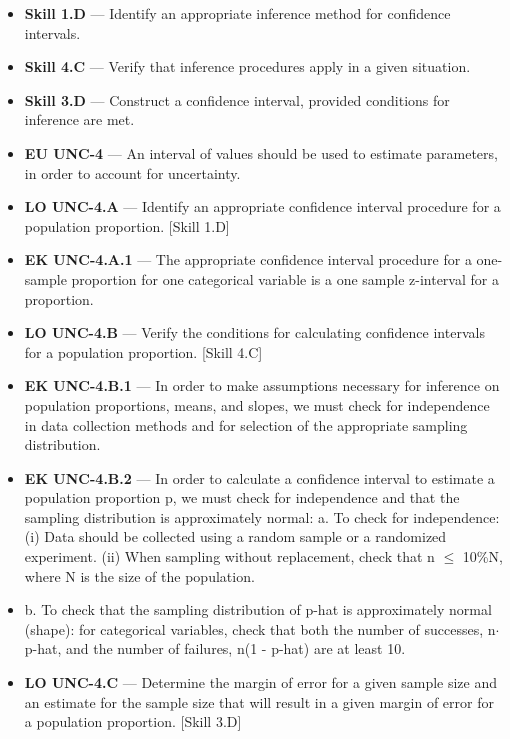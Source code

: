 \documentclass[11pt]{article}
\begin{document}


{\small
\begin{itemize}[leftmargin=1.5em,itemsep=2pt,topsep=2pt]
  \item \textbf{Skill 1.D} --- Identify an appropriate inference method for confidence intervals.
  \item \textbf{Skill 4.C} --- Verify that inference procedures apply in a given situation.
  \item \textbf{Skill 3.D} --- Construct a confidence interval, provided conditions for inference are met.
  \item \textbf{EU UNC-4} --- An interval of values should be used to estimate parameters, in order to account for uncertainty.
  \item \textbf{LO UNC-4.A} --- Identify an appropriate confidence interval procedure for a population proportion. [Skill 1.D]
  \item \textbf{EK UNC-4.A.1} --- The appropriate confidence interval procedure for a one-sample proportion for one categorical variable is a one sample z-interval for a proportion.
  \item \textbf{LO UNC-4.B} --- Verify the conditions for calculating confidence intervals for a population proportion. [Skill 4.C]
  \item \textbf{EK UNC-4.B.1} --- In order to make assumptions necessary for inference on population proportions, means, and slopes, we must check for independence in data collection methods and for selection of the appropriate sampling distribution.
  \item \textbf{EK UNC-4.B.2} --- In order to calculate a confidence interval to estimate a population proportion p, we must check for independence and that the sampling distribution is approximately normal: a. To check for independence: (i) Data should be collected using a random sample or a randomized experiment. (ii) When sampling without replacement, check that n $\leq$ 10\%N, where N is the size of the population.
  \item b. To check that the sampling distribution of p-hat is approximately normal (shape): for categorical variables, check that both the number of successes, n$\cdot$p-hat, and the number of failures, n(1 - p-hat) are at least 10.
  \item \textbf{LO UNC-4.C} --- Determine the margin of error for a given sample size and an estimate for the sample size that will result in a given margin of error for a population proportion. [Skill 3.D]

\end{itemize}}
\end{document}
